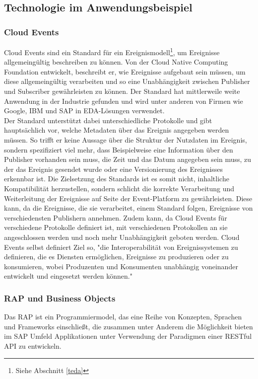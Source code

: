\subsection{Technologie im Anwendungsbeispiel}

\subsubsection*{Cloud Events}
\label{cloudev}
Cloud Events sind ein Standard für ein Ereignismodell\footnote{Siehe Abschnitt \ref*{teda}}, um Ereignisse allgemeingültig beschreiben zu können. Von der Cloud Native Computing Foundation entwickelt, beschreibt er, wie Ereignisse aufgebaut sein müssen, um diese allgemeingültig verarbeiten und so eine Unabhängigkeit zwischen Publisher und Subscriber gewährleisten zu können. Der Standard hat mittlerweile weite Anwendung in der Industrie gefunden und wird unter anderen von Firmen wie Google, IBM und SAP in \ac{EDA}-Lösungen verwendet. \cite[Vgl. ]{cloudevent} \\
Der Standard unterstützt dabei unterschiedliche Protokolle und gibt hauptsächlich vor, welche Metadaten über das Ereignis angegeben werden müssen. So trifft er keine Aussage über die Struktur der Nutzdaten im Ereignis, sondern spezifiziert viel mehr, dass Beispielweise eine Information über den Publisher vorhanden sein muss, die Zeit und das Datum angegeben sein muss, zu der das Ereignis gesendet wurde oder eine Versionierung des Ereignisses erkennbar ist. Die Zielsetzung des Standards ist es somit nicht, inhaltliche Kompatibilität herzustellen, sondern schlicht die korrekte Verarbeitung und Weiterleitung der Ereignisse auf Seite der Event-Platform zu gewährleisten. Diese kann, da die Ereignisse, die sie verarbeitet, einem Standard folgen, Ereignisse von verschiedensten Publishern annehmen. Zudem kann, da Cloud Events für verschiedene Protokolle definiert ist, mit verschiedenen Protokollen an sie angeschlossen werden und noch mehr Unabhängigkeit geboten werden. Cloud Events selbst definiert Ziel so, "die Interoperabilität von Ereignissystemen zu definieren, die es Diensten ermöglichen, Ereignisse zu produzieren oder zu konsumieren, wobei Produzenten und Konsumenten unabhängig voneinander entwickelt und eingesetzt werden können."\ \cite[Vgl. ]{cloudeventprimer}

\subsubsection*{RAP und Business Objects}
Das \acl{RAP} ist ein Programmiermodel, das eine Reihe von Konzepten, Sprachen und Frameworks einschließt, die zusammen unter Anderem die Möglichkeit bieten im SAP Umfeld Applikationen unter Verwendung der Paradigmen einer \ac*{REST}ful \ac{API} zu entwickeln. \cite[Vgl.][]{sapse_rap}

